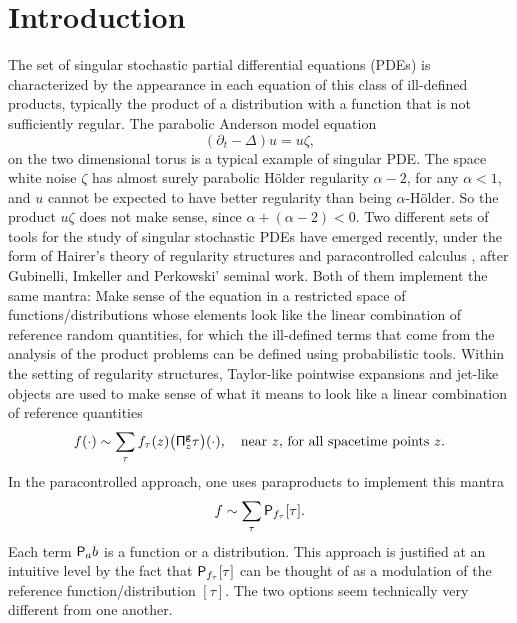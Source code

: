\documentclass[JEP,XML,SOM,Unicode,published]{cedram}
\theoremstyle{plain}
\theoremstyle{definition}
\begin{document}
\maketitle
\tableofcontents
\mainmatter

\section{Introduction}
\label{SectionIntro}

The set of singular stochastic partial differential equations (PDEs) is characterized by the appearance in each equation of this class of ill-defined products, typically the product of a distribution with a function that is not sufficiently regular. The parabolic Anderson model equation
\[
(\partial_t-\Delta) u = u\zeta,
\]
on the two dimensional torus is a typical example of singular PDE. The space white noise $\zeta$ has almost surely parabolic Hölder regularity $\alpha-2$, for any $\alpha<1$, and $u$ cannot be expected to have better regularity than being $\alpha$-Hölder. So the product $u\zeta$ does not make sense, since $\alpha+(\alpha-2)<0$. Two different sets of tools for the study of singular stochastic PDEs have emerged recently, under the form of Hairer's theory of regularity structures \cite{Hai, BHZ, CH16, BCCH18} and paracontrolled calculus \cite{GIP, BBF15, BB16}, after Gubinelli, Imkeller and Perkowski' seminal work. Both of them implement the same mantra: Make sense of the equation in a restricted space of functions/distributions whose elements look like the linear combination of reference random quantities, for which the ill-defined terms that come from the analysis of the product problems can be defined using probabilistic tools. Within the setting of regularity structures, Taylor-like pointwise expansions and jet-like objects are used to make sense of what it means to look like a linear combination of reference quantities
\[
f (\cdot) \sim \sum_\tau f_\tau(z)\bigl({\sf \Pi}^{\sf g}_z\tau\bigr)(\cdot), \quad \textrm{near $z$, for all spacetime points $z$}.
\]
In the paracontrolled approach, one uses paraproducts to implement this mantra
\[
f \sim \sum_\tau {\sf P}_{f_\tau}[\tau].
\]
Each term ${\sf P}_ab$ is a function or a distribution. This approach is justified at an intuitive level by the fact that ${\sf P}_{f_\tau}[\tau]$ can be thought of as a modulation of the reference function/distribution $[\tau]$. The two options seem technically very different from one another.
\end{document}
